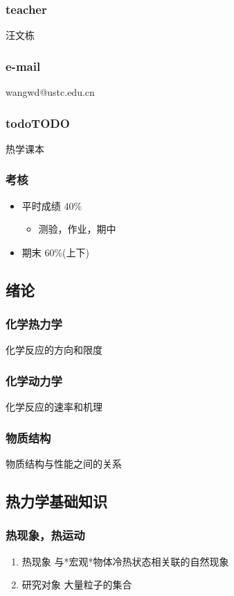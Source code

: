 \documentclass[11pt]{article}
\begin{document}
\subsubsection{teacher}
\label{sec:org154a8cc}
汪文栋
\subsubsection{e-mail}
\label{sec:org1820d42}
wangwd@ustc.edu.cn
\subsubsection{todo\hfill{}\textsc{TODO}}
\label{sec:orgf49b60e}
热学课本
\subsubsection{考核}
\label{sec:org65408f1}
\begin{itemize}
\item 平时成绩 40\%
\begin{itemize}
\item 测验，作业，期中
\end{itemize}
\item 期末 60\%(上下)
\end{itemize}


\subsection{绪论}
\label{sec:org3582456}
\subsubsection{化学热力学}
\label{sec:orga3c3d0b}
化学反应的方向和限度
\subsubsection{化学动力学}
\label{sec:org701b36b}
化学反应的速率和机理
\subsubsection{物质结构}
\label{sec:org65feaf8}
物质结构与性能之间的关系

\subsection{热力学基础知识}
\label{sec:org969c45c}
\subsubsection{热现象，热运动}
\label{sec:org52aa19a}
\begin{enumerate}
\item 热现象
\label{sec:org9ad9a5e}
与*宏观*物体冷热状态相关联的自然现象
\item 研究对象
\label{sec:org18b37f7}
大量粒子的集合
\end{enumerate}
\end{document}
